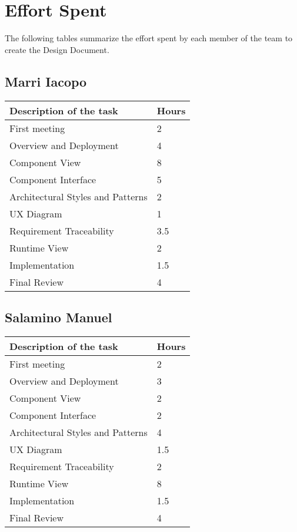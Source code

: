 \section{Effort Spent}
The following tables summarize the effort spent by each member of the team to create the Design Document.

\subsection{Marri Iacopo}
\begin{center}
\renewcommand{\arraystretch}{1.5}
\begin{tabular}{ |m{7cm}|m{2cm}| } 
 \hline
 \textbf{Description of the task}  & \textbf{Hours} \\
 \hline
 First meeting & 2 \\
 \hline
 Overview and Deployment & 4 \\
 \hline
 Component View & 8\\ 
 \hline
 Component Interface &  5 \\
 \hline
 Architectural Styles and Patterns & 2 \\ 
 \hline 
 UX Diagram &  1 \\
 \hline
 Requirement Traceability & 3.5 \\ 
 \hline
 Runtime View & 2 \\
 \hline
 Implementation & 1.5 \\
 \hline
 Final Review &  4 \\
 \hline
\end{tabular}
\end{center}


\subsection{Salamino Manuel}
\begin{center}
\renewcommand{\arraystretch}{1.5}
\begin{tabular}{ |m{7cm}|m{2cm}| } 
 \hline
 \textbf{Description of the task}  & \textbf{Hours} \\
 \hline
 First meeting & 2 \\
 \hline
 Overview and Deployment & 3 \\
 \hline
 Component View & 2\\ 
 \hline
 Component Interface &  2 \\
 \hline
 Architectural Styles and Patterns & 4 \\ 
 \hline 
 UX Diagram &  1.5 \\
 \hline
 Requirement Traceability & 2 \\ 
 \hline
 Runtime View & 8 \\
 \hline
 Implementation & 1.5 \\
 \hline
 Final Review &  4 \\
 \hline
\end{tabular}
\end{center}

